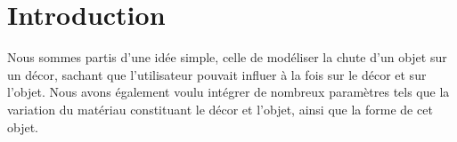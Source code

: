\section{Introduction}
Nous sommes partis d'une idée simple, celle de modéliser la chute d'un objet sur un
décor, sachant que l'utilisateur pouvait influer à la fois sur le décor et sur l'objet.
Nous avons également voulu intégrer de nombreux paramètres tels que la 
variation du matériau constituant le décor et l'objet, ainsi que la forme de cet objet.
